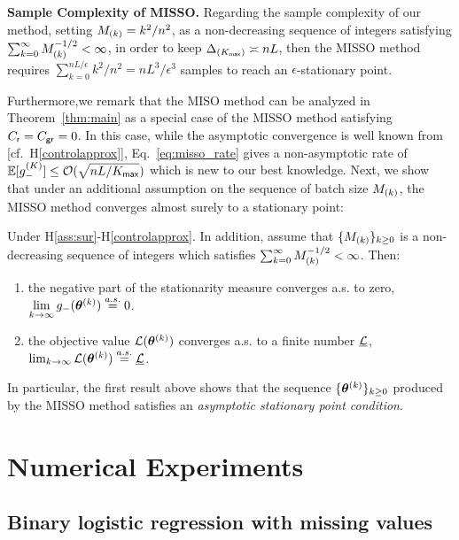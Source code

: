 \documentclass{article}
\begin{document}
\textbf{Sample Complexity of MISSO.}
Regarding the sample complexity of our method, setting $\Bsize{k} = k^2/n^2$, as a non-decreasing sequence of integers satisfying $\sum_{k=0}^{\infty}{\Bsize{k}^{-1/2}} < \infty$, in order to keep $\Delta_{( K_{\sf max} )} \asymp nL$, then the MISSO method requires $\sum_{k=0}^{nL/\epsilon} k^2/n^2 = nL^3 / \epsilon^3$ samples to reach an $\epsilon$-stationary point. 

Furthermore,we remark that the MISO method can be analyzed in Theorem~\ref{thm:main} as a special case of the MISSO method satisfying $C_{\sf r} = C_{\sf gr} = 0$. In this case, while the asymptotic convergence is well known from~\cite{mairal2015miso} [cf.~H\ref{controlapprox}], Eq.~\eqref{eq:misso_rate} gives a non-asymptotic rate of $\EE[ g_-^{(K)} ] \leq  {\cal O}( \sqrt{n L / K_{\sf max}} )$ which is new to our best knowledge.
Next, we show that under an additional assumption on the sequence of batch size $\Bsize{k}$, the MISSO method converges almost surely to a stationary point:
\begin{theo} \label{thm:mainasymp}
Under H\ref{ass:sur}-H\ref{controlapprox}. In addition, assume that $\{\Bsize{k}\}_{k \geq 0}$ is a non-decreasing sequence of integers which satisfies $\sum_{k=0}^{\infty}{\Bsize{k}^{-1/2}} < \infty$. Then:
\vspace{-0.08in}
\begin{enumerate}[leftmargin=.35cm]
\item the negative part of the stationarity measure converges a.s. to zero, \ie $\textstyle \lim \limits_{ k \rightarrow \infty} g_-( \hp{k})  \overset{a.s.}{=} 0$. 
\item the objective value ${\cal L} ( \hp{k} )$ converges a.s. to a finite number $\underline{\cal L}$, \ie $\lim_{k \rightarrow \infty} {\cal L} ( \hp{k} )\overset{a.s.}{=} \underline{\cal L}$.
\end{enumerate}
\end{theo}
In particular, the first result above shows that the sequence $\{ \hp{k} \}_{k \geq 0}$ produced by the MISSO method satisfies an \emph{asymptotic stationary point condition}.

\vspace{-0.05in}
\section{Numerical Experiments}\label{sec:numerical}
\vspace{-0.05in}

\subsection{Binary logistic regression with missing values}\label{logisticreg}
\end{document}
